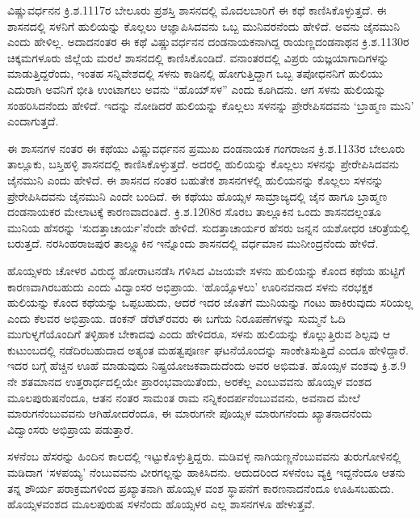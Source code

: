 ವಿಷ್ಣುವರ್ಧನನ ಕ್ರಿ.ಶ.1117ರ ಬೇಲೂರು ಪ್ರಶಸ್ತಿ ಶಾಸನದಲ್ಲಿ ಮೊದಲಬಾರಿಗೆ ಈ ಕಥೆ ಕಾಣಿಸಿಕೊಳ್ಳುತ್ತದೆ. ಈ ಶಾಸನದಲ್ಲಿ ಸಳನಿಗೆ ಹುಲಿಯನ್ನು ಕೊಲ್ಲಲು ಆಜ್ಞಾಪಿಸಿದವನು ಒಬ್ಬ ಮುನಿವರನೆಂದು ಹೇಳಿದೆ. ಅವನು ಜೈನಮುನಿ ಎಂದು ಹೇಳಿಲ್ಲ. ಅದಾದನಂತರ ಈ ಕಥೆ ವಿಷ್ಣುವರ್ಧನನ ದಂಡನಾಯಕನಾಗಿದ್ದ ರಾಯಣ್ಣದಂಡನಾಥನ ಕ್ರಿ.ಶ.1130ರ ಚಿಕ್ಕಮಗಳೂರು ಜಿಲ್ಲೆಯ ಮರಲೆ ಶಾಸನದಲ್ಲಿ ಕಾಣಿಸಿಕೊಂಡಿದೆ. ವನಾಂತರದಲ್ಲಿ ವಿಪ್ರರು ಯಜ್ಞಯಾಗಾದಿಗಳನ್ನು ಮಾಡುತ್ತಿದ್ದರೆಂದು, ಇಂತಹ ಸನ್ನಿವೇಶದಲ್ಲಿ ಸಳನು ಕಾಡಿನಲ್ಲಿ ಹೋಗುತ್ತಿದ್ದಾಗ ಒಬ್ಬ ತಪೋಧನನಿಗೆ ಹುಲಿಯು ಎದುರಾಗಿ ಅವನಿಗೆ ಭೀತಿ ಉಂಟಾಗಲು ಅವನು “ಹೊಯ್​ಸಳ” ಎಂದು ಕೂಗಿದನು. ಆಗ ಸಳನು ಹುಲಿಯನ್ನು ಸಂಹರಿಸಿದನೆಂದು ಹೇಳಿದೆ. ಇದನ್ನು ನೋಡಿದರೆ ಹುಲಿಯನ್ನು ಕೊಲ್ಲಲು ಸಳನನ್ನು ಪ್ರೇರೇಪಿಸದವನು ‘ಬ್ರಾಹ್ಮಣ ಮುನಿ’ ಎಂದಾಗುತ್ತದೆ. 

ಈ ಶಾಸನಗಳ ನಂತರ ಈ ಕಥೆಯು ವಿಷ್ಣುವರ್ಧನನ ಪ್ರಮುಖ ದಂಡನಾಯಕ ಗಂಗರಾಜನ ಕ್ರಿ.ಶ.1133ರ ಬೇಲೂರು ತಾಲ್ಲೂಕು, ಬಸ್ತಿಹಳ್ಳಿ ಶಾಸನದಲ್ಲಿ ಕಾಣಿಸಿಕೊಳ್ಳುತ್ತದೆ. ಅದರಲ್ಲಿ ಹುಲಿಯನ್ನು ಕೊಲ್ಲಲು ಸಳನನ್ನು ಪ್ರೇರೇಪಿಸಿದವನು ಜೈನಮುನಿ ಎಂದು ಹೇಳಿದೆ. ಈ ಶಾಸನದ ನಂತರ ಬಹುತೇಕ ಶಾಸನಗಳಲ್ಲಿ ಹುಲಿಯನನ್ನು ಕೊಲ್ಲಲು ಸಳನನ್ನು ಪ್ರೇರೇಪಿಸಿದವನು ಜೈನಮುನಿ ಎಂದೇ ಬಂದಿದೆ. ಈ ಕಥೆಯು ಹೊಯ್ಸಳ ಸಾಮ್ರಾಜ್ಯದಲ್ಲಿ ಜೈನ ಹಾಗೂ ಬ್ರಾಹ್ಮಣ ದಂಡನಾಯಕರ ಮೇಲಾಟಕ್ಕೆ ಕಾರಣವಾದಂತಿದೆ. ಕ್ರಿ.ಶ.1208ರ ಸೊರಬ ತಾಲ್ಲೂಕಿನ ಒಂದು ಶಾಸನದಲ್ಲಂತೂ ಮುನಿಯ ಹೆಸರನ್ನು ‘ಸುದತ್ತಾಚಾರ್ಯ’ನೆಂದೇ ಹೇಳಿದೆ. ಸುದತ್ತಾಚಾರ್ಯರ ಹೆಸರು ಜನ್ನನ ಯಶೋಧರ ಚರಿತ್ರೆಯಲ್ಲಿ ಬರುತ್ತದೆ. ನರಸಿಂಹರಾಜಪುರ ತಾಲ್ಲ್ಲೂಕಿನ ಇನ್ನೊಂದು ಶಾಸನದಲ್ಲಿ ವರ್ಧಮಾನ ಮುನೀಂದ್ರನೆಂದು ಹೇಳಿದೆ.

ಹೊಯ್ಸಳರು ಚೋಳರ ವಿರುದ್ಧ ಹೋರಾಟನಡೆಸಿ ಗಳಿಸಿದ ವಿಜಯವೇ ಸಳನು ಹುಲಿಯನ್ನು ಕೊಂದ ಕಥೆಯ ಹುಟ್ಟಿಗೆ ಕಾರಣವಾಗಿರಬಹುದು ಎಂದು ವಿದ್ವಾಂಸರ ಅಭಿಪ್ರಾಯ. ‘ಹೊಯ್ಸೊಳಲು’ ಊರಿನವನಾದ ಸಳನು ನರಭಕ್ಷಕ ಹುಲಿಯನ್ನು ಕೊಂದ ಕಥೆಯನ್ನು ಒಪ್ಪಬಹುದು, ಆದರೆ ಇದರ ಜೊತೆಗೆ ಮುನಿಯನ್ನು ಗಂಟು ಹಾಕಿರುವುದು ಸರಿಯಲ್ಲ ಎಂದು ಕೆಲವರ ಅಭಿಪ್ರಾಯ. ಡಂಕನ್​ ಡೆರೆಟ್​ರವರು ಈ ಬಗೆಯ ನಿರೂಪಣೆಗಳನ್ನು ಸುಮ್ಮನೆ ಓದಿ ಮುಗುಳ್ನಗೆಯೊಂದಿಗೆ ತಳ್ಳಿಹಾಕ ಬೇಕಾದವು ಎಂದು ಹೇಳಿದರೂ, ಸಳನು ಹುಲಿಯನ್ನು ಕೊಲ್ಲುತ್ತಿರುವ ಶಿಲ್ಪವು ಆ ಕುಟುಂಬದಲ್ಲಿ ನಡೆದಿರಬಹುದಾದ ಅತ್ಯಂತ ಮಹತ್ವಪೂರ್ಣ ಘಟನೆಯೊಂದನ್ನು ಸಾಂಕೇತಿಸುತ್ತಿದೆ ಎಂದೂ ಹೇಳಿದ್ದಾರೆ. ಇದರ ಬಗ್ಗೆ ಹೆಚ್ಚಿನ ಊಹೆ ಮಾಡುವುದು ನಿಷ್ಪ್ರಯೋಜಕವಾದುದೆಂದು ಅವರ ಅಭಿಮತ. ಹೊಯ್ಸಳ ವಂಶವು ಕ್ರಿ.ಶ.9 ನೇ ಶತಮಾನದ ಉತ್ತರಾರ್ಧದಲ್ಲಿಯೇ ಪ್ರಾರಂಭವಾಯಿತೆಂದು, ಅರಕೆಲ್ಲ ಎಂಬುವವನು ಹೊಯ್ಸಳ ವಂಶದ ಮೂಲಪುರುಷನೆಂದೂ, ಆತನ ನಂತರ ಸಾಮಂತ ರಾಮ ನನ್ನಿಕಂದರ್ಪನೆಂಬುವವನು, ಅವನಾದ ಮೇಲೆ ಮಾರುಗನೆಂಬುವವನು ಆಗಿಹೋದರೆಂದೂ, ಈ ಮಾರುಗನೇ ಪೊಯ್ಸಳ ಮಾರುಗನೆಂದು ಖ್ಯಾತನಾದನೆಂದು ವಿದ್ವಾಂಸರು ಅಭಿಪ್ರಾಯ ಪಡುತ್ತಾರೆ.

ಸಳನೆಂಬ ಹೆಸರನ್ನು ಹಿಂದಿನ ಕಾಲದಲ್ಲಿ ಇಟ್ಟುಕೊಳ್ಳುತ್ತಿದ್ದರು. ಮಡಿವಳ್ಳ ನಾಗಿಯಣ್ಣನೆಂಬುವವನು ತುರುಗೋಳಿನಲ್ಲಿ ಮಡಿದಾಗ ‘ಸಳಪಯ್ಯ’ ನೆಂಬುವವನು ವೀರಗಲ್ಲನ್ನು ಹಾಕಿಸಿದನು. ಆದುದರಿಂದ ಸಳನೆಂಬ ವ್ಯಕ್ತಿ ಇದ್ದನೆಂದೂ ಆತನು ತನ್ನ ಶೌರ್ಯ ಪರಾಕ್ರಮಗಳಿಂದ ಪ್ರಖ್ಯಾತನಾಗಿ ಹೊಯ್ಸಳ ವಂಶ ಸ್ಥಾಪನೆಗೆ ಕಾರಣನಾದನೆಂದೂ ಊಹಿಸಬಹುದು. ಹೊಯ್ಸಳವಂಶದ ಮೂಲಪುರುಷ ಸಳನೆಂದು ಹೊಯ್ಸಳರ ಎಲ್ಲ ಶಾಸನಗಳೂ ಹೇಳುತ್ತವೆ. 

